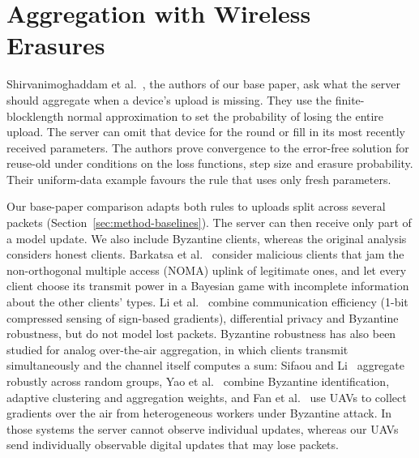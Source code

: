 \section{Aggregation with Wireless Erasures}
Shirvanimoghaddam et al.~\cite{shirvanimoghaddam2022erroneous}, the authors of
our base paper, ask what the server should aggregate when a device's upload is
missing. They use the finite-blocklength normal approximation to set the probability
of losing the entire upload. The server can omit that device for the round or fill
in its most recently received parameters. The authors prove convergence to the
error-free solution for reuse-old under conditions on the loss functions,
step size and erasure probability. Their uniform-data example favours the rule
that uses only fresh parameters.

Our base-paper comparison adapts both rules to uploads split across several
packets (Section~\ref{sec:method-baselines}). The server can then receive only
part of a model update. We also include Byzantine clients, whereas the original
analysis considers honest clients. Barkatsa et al.~\cite{barkatsa2024jamming} consider malicious clients that jam the
non-orthogonal multiple access (NOMA) uplink of legitimate ones, and let every client
choose its transmit power in a Bayesian game with incomplete information about the
other clients' types. Li et al.~\cite{li2022dpbyz} combine communication efficiency (1-bit
compressed sensing of sign-based gradients), differential privacy and Byzantine
robustness, but do not model lost packets. Byzantine robustness has also been studied
for analog over-the-air aggregation, in which clients transmit simultaneously and the
channel itself computes a sum: Sifaou and Li~\cite{sifaou2022ota} aggregate robustly across random
groups, Yao et al.~\cite{yao2025fedsac} combine Byzantine identification, adaptive clustering
and aggregation weights, and Fan et al.~\cite{fan2026uavbyz} use UAVs to collect gradients over
the air from heterogeneous workers under Byzantine attack. In those systems the server
cannot observe individual updates, whereas our UAVs send individually observable
digital updates that may lose packets.


